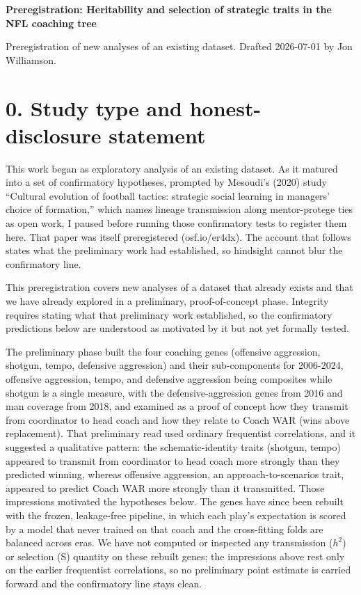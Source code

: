 \documentclass[11pt]{article}
\begin{document}
\begin{center}{\LARGE\bfseries Preregistration: Heritability and selection of strategic traits in the NFL coaching tree}\end{center}
\vspace{0.5em}

Preregistration of new analyses of an existing dataset. Drafted 2026-07-01 by Jon Williamson.

\section*{0. Study type and honest-disclosure statement}

This work began as exploratory analysis of an existing dataset. As it matured into a set of confirmatory hypotheses, prompted by Mesoudi's (2020) study ``Cultural evolution of football tactics: strategic social learning in managers' choice of formation,'' which names lineage transmission along mentor-protege ties as open work, I paused before running those confirmatory tests to register them here. That paper was itself preregistered (osf.io/er4dx). The account that follows states what the preliminary work had established, so hindsight cannot blur the confirmatory line.

This preregistration covers new analyses of a dataset that already exists and that we have already explored in a preliminary, proof-of-concept phase. Integrity requires stating what that preliminary work established, so the confirmatory predictions below are understood as motivated by it but not yet formally tested.

The preliminary phase built the four coaching genes (offensive aggression, shotgun, tempo, defensive aggression) and their sub-components for 2006-2024, offensive aggression, tempo, and defensive aggression being composites while shotgun is a single measure, with the defensive-aggression genes from 2016 and man coverage from 2018, and examined as a proof of concept how they transmit from coordinator to head coach and how they relate to Coach WAR (wins above replacement). That preliminary read used ordinary frequentist correlations, and it suggested a qualitative pattern: the schematic-identity traits (shotgun, tempo) appeared to transmit from coordinator to head coach more strongly than they predicted winning, whereas offensive aggression, an approach-to-scenarios trait, appeared to predict Coach WAR more strongly than it transmitted. Those impressions motivated the hypotheses below. The genes have since been rebuilt with the frozen, leakage-free pipeline, in which each play's expectation is scored by a model that never trained on that coach and the cross-fitting folds are balanced across eras. We have not computed or inspected any transmission ($h^{2}$) or selection (S) quantity on these rebuilt genes; the impressions above rest only on the earlier frequentist correlations, so no preliminary point estimate is carried forward and the confirmatory line stays clean.
\end{document}
